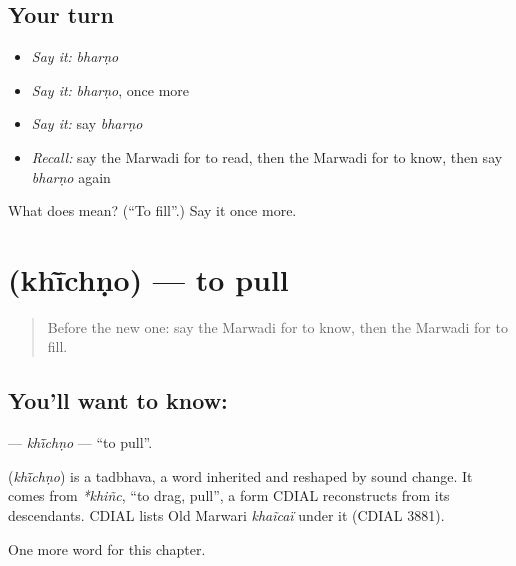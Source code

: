 \subsection*{Your turn}
\begin{itemize}
\raggedright
  \item \emph{Say it:} \emph{bharṇo}
  \item \emph{Say it:} \emph{bharṇo}, once more
  \item \emph{Say it:} say \emph{bharṇo}
  \item \emph{Recall:} say the Marwadi for to read, then the Marwadi for to know, then say \emph{bharṇo} again
\end{itemize}

\begin{tcolorbox}[breakable,colback=teal!4,colframe=teal!35!black,title={Before you move on}]
What does  mean? (\textquotedblleft{}To fill\textquotedblright{}.) Say it once more.
\end{tcolorbox}
\section[\texorpdfstring{\mw{खींचणो} (khī̃chṇo)}{खींचणो (khī̃chṇo)}]{ (khī̃chṇo) — to pull}

\label{lesson:MW-C105-khichno}



\begin{quote}
Before the new one: say the Marwadi for to know, then the Marwadi for to fill.
\end{quote}

\subsection*{You'll want to know: }
\textbf{} — \emph{khī̃chṇo} — \textquotedblleft{}to pull\textquotedblright{}.

\begin{cousinweb}
\textbf{} (\emph{khī̃chṇo}) is a tadbhava, a word inherited and reshaped by sound change. It comes from \emph{*khiñc}, \textquotedblleft{}to drag, pull\textquotedblright{}, a form CDIAL reconstructs from its descendants. CDIAL lists Old Marwari \emph{khaĩcaï} under it (CDIAL 3881).
\end{cousinweb}

\begin{grammarlens}[title={What you've built}]
One more word for this chapter.
\end{grammarlens}

